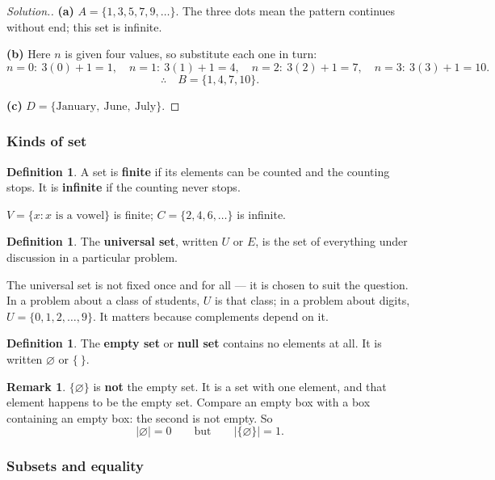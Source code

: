 \documentclass[11pt,a4paper]{article}
\theoremstyle{definition}
\newtheorem{definition}[thm]{Definition}
\newtheorem{remark}[thm]{Remark}
\newenvironment{solution}
  {\renewcommand{\qedsymbol}{}\begin{proof}[\textit{Solution}.]}
  {\end{proof}}
\begin{document}
\begin{solution}
\textbf{(a)} $A=\{1,3,5,7,9,\ldots\}$. The three dots mean the pattern continues
without end; this set is infinite.

\textbf{(b)} Here $n$ is given four values, so substitute each one in turn:
$$n=0:\ 3(0)+1=1,\quad n=1:\ 3(1)+1=4,\quad n=2:\ 3(2)+1=7,\quad n=3:\ 3(3)+1=10.$$
$$\therefore\quad B=\{1,4,7,10\}.$$

\textbf{(c)} $D=\{\text{January},\ \text{June},\ \text{July}\}$.
\end{solution}

\subsubsection{Kinds of set}

\begin{definition}
A set is \textbf{finite} if its elements can be counted and the counting stops. It is
\textbf{infinite} if the counting never stops.
\end{definition}

$V=\{x:x\text{ is a vowel}\}$ is finite; $C=\{2,4,6,\ldots\}$ is infinite.

\begin{definition}
The \textbf{universal set}, written $U$ or $E$, is the set of everything under
discussion in a particular problem.
\end{definition}

The universal set is not fixed once and for all --- it is chosen to suit the
question. In a problem about a class of students, $U$ is that class; in a problem
about digits, $U=\{0,1,2,\ldots,9\}$. It matters because complements depend on it.

\begin{definition}
The \textbf{empty set} or \textbf{null set} contains no elements at all. It is
written $\varnothing$ or $\{\ \}$.
\end{definition}

\begin{remark}
$\{\varnothing\}$ is \textbf{not} the empty set. It is a set with one element, and
that element happens to be the empty set. Compare an empty box with a box containing
an empty box: the second is not empty. So
$$|\varnothing|=0\qquad\text{but}\qquad |\{\varnothing\}|=1.$$
\end{remark}

\subsubsection{Subsets and equality}
\end{document}
